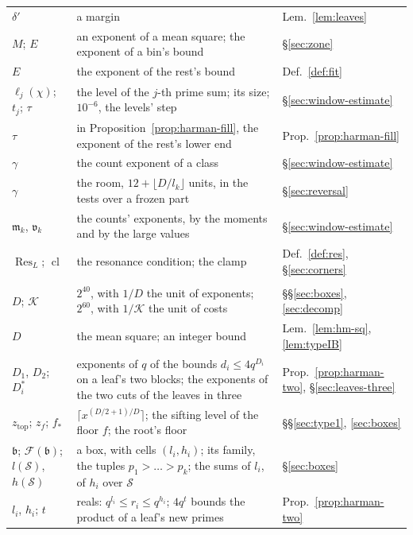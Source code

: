 \documentclass[11pt]{article}
\theoremstyle{definition}
\begin{document}
{\begin{longtable}{@{}>{\raggedright\arraybackslash}p{}
  >{\raggedright\arraybackslash}p{}
  >{\raggedright\arraybackslash}p{}@{}}
$\delta'$ & a margin & Lem.~\ref{lem:leaves} \\
$M$; $E$ & an exponent of a mean square; the exponent of a bin's bound & \S\ref{sec:zone} \\
$E$ & the exponent of the rest's bound & Def.~\ref{def:fit} \\
$\ell_j(\chi)$; $t_j$; $\tau$ & the level of the $j$-th prime sum; its size; $10^{-6}$, the levels' step &
  \S\ref{sec:window-estimate} \\
$\tau$ & in Proposition~\ref{prop:harman-fill}, the exponent of the rest's lower end & Prop.~\ref{prop:harman-fill} \\
$\gamma$ & the count exponent of a class & \S\ref{sec:window-estimate} \\
$\gamma$ & the room, $12 + \lfloor D/l_k \rfloor$ units, in the tests over a frozen part & \S\ref{sec:reversal} \\
$\mathfrak m_k$, $\mathfrak v_k$ & the counts' exponents, by the moments and by the large values &
  \S\ref{sec:window-estimate} \\
$\operatorname{Res}_L$; $\operatorname{cl}$ & the resonance condition; the clamp & Def.~\ref{def:res},
  \S\ref{sec:corners} \\
\midrule
\multicolumn{3}{@{}l}{\emph{The sieve: boxes, floors, trees and costs}} \\
$D$; $\mathcal K$ & $2^{40}$, with $1/D$ the unit of exponents; $2^{60}$, with $1/\mathcal K$ the unit of costs &
  \S\S\ref{sec:boxes},
  \ref{sec:decomp} \\
$D$ & the mean square; an integer bound & Lem.~\ref{lem:hm-sq}, \ref{lem:typeIB} \\
$D_1$, $D_2$; $D_i^*$ & exponents of $q$ of the bounds $d_i \le 4q^{D_i}$ on a leaf's two blocks; the exponents of the
  two cuts of the leaves in three & Prop.~\ref{prop:harman-two}, \S\ref{sec:leaves-three} \\
$z_{\mathrm{top}}$; $z_f$; $f_*$ & $\lceil x^{(D/2 + 1)/D} \rceil$; the sifting level of the floor $f$; the root's floor
  & \S\S\ref{sec:type1}, \ref{sec:boxes} \\
$\mathfrak b$; $\mathcal F(\mathfrak b)$; $l(\mathcal S)$, $h(\mathcal S)$ & a box, with cells $(l_i, h_i)$; its
  family, the tuples $p_1 > \dots > p_k$; the
  sums of $l_i$, of $h_i$ over $\mathcal S$ & \S\ref{sec:boxes} \\
$l_i$, $h_i$; $t$ & reals: $q^{l_i} \le r_i \le q^{h_i}$; $4q^t$ bounds the product of a leaf's new primes &
  Prop.~\ref{prop:harman-two} \\

\end{longtable}}
\end{document}
